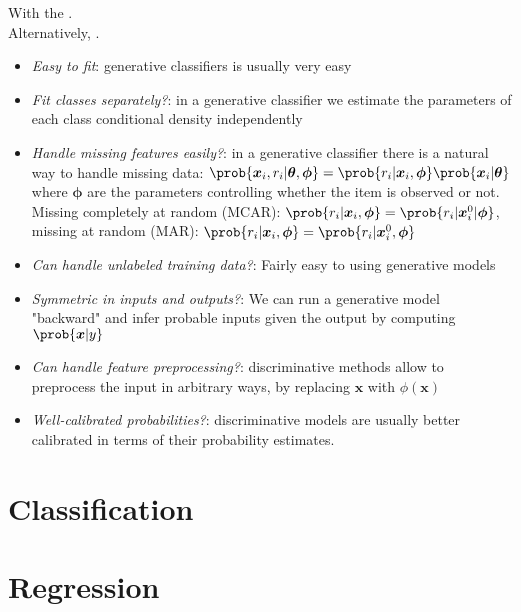 
With the .\\
Alternatively, .

\begin{itemize}
    \item \emph{Easy to fit}: generative classifiers is usually very easy
    \item \emph{Fit classes separately?}: in a generative classifier we estimate the parameters 
        of each class conditional density independently
    \item \emph{Handle missing features easily?}: in a generative classifier there is a natural way
        to handle missing data: $\prob{\bm{x}_{i},r_{i}|\bm{\theta},\bm{\phi}} = \prob{r_{i}|\bm{
        x}_{i},\bm{\phi}}\prob{\bm{x}_{i}|\bm{\theta}}$ where $\bm{\phi}$ are the parameters
        controlling whether the item is observed or not. Missing completely at random (MCAR): $\prob{
        r_{i}|\bm{x}_{i},\bm{\phi}} = \prob{r_{i}|\bm{x}^{0}_{i}|\bm{\phi}}$, missing at random 
        (MAR): $\prob{r_{i}|\bm{x}_{i},\bm{\phi}} = \prob{r_{i}|\bm{x}^{0}_{i},\bm{\phi}}$
    \item \emph{Can handle unlabeled training data?}: Fairly easy to using generative models
    \item \emph{Symmetric in inputs and outputs?}: We can run a generative model "backward" and 
        infer probable inputs given the output by computing $\prob{\bm{x}|y}$
    \item \emph{Can handle feature preprocessing?}: discriminative methods allow to preprocess the
        input in arbitrary ways, by replacing $\bm{x}$ with $\phi(\bm{x})$
    \item \emph{Well-calibrated probabilities?}: discriminative models are usually better calibrated
        in terms of their probability estimates.
\end{itemize}


\section{Classification}


\section{Regression}


